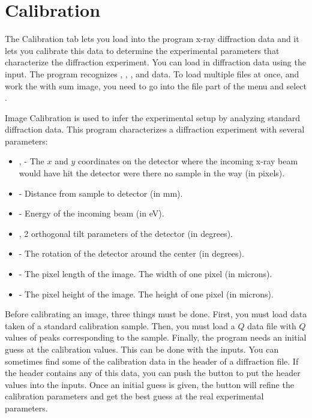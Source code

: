 \section{Calibration}

The Calibration tab lets you load into the program 
x-ray diffraction data and it lets you calibrate 
this data to determine the experimental parameters 
that characterize the diffraction experiment. You 
can load in diffraction data using the 
 input. The program 
recognizes , , 
, and  data. To load 
multiple files at once, and work the with sum image, 
you need to go into the file part of the menu and 
select .

Image Calibration is used to infer the experimental 
setup by analyzing standard diffraction data. This 
program characterizes a diffraction experiment 
with several parameters:
\index{$\alpha$}
\index{$\beta$}
\begin{itemize}
    \item {},  - The $x$ 
and $y$ coordinates on the detector where the incoming 
x-ray beam would have hit the detector were there 
no sample in the way (in pixels).
    \item {} - Distance from sample to 
        detector (in mm).
    \item {} - Energy of the incoming beam (in eV).
    \item {},  2 orthogonal tilt 
        parameters of the detector (in degrees).
    \item {} - The rotation of the detector 
        around the center (in degrees).
    \item {} - The pixel length of the image. 
        The width of one pixel (in microns).
    \item {} - The pixel height of the image. 
        The height of one pixel (in microns).
\end{itemize}

Before calibrating an image, three things must be done. 
First, you must load data taken of a standard calibration 
sample. Then, you must load a $Q$ data file with $Q$ values 
of peaks corresponding to the sample. Finally, the program 
needs an initial guess at the calibration values. This can 
be done with the  inputs. You can sometimes 
find some of the calibration data in the header of a 
diffraction file. If the header contains any of this data, 
you can push the  button to put the 
header values into the inputs. Once an initial guess is 
given, the  button will refine the calibration 
parameters and get the best guess at the real experimental 
parameters.

